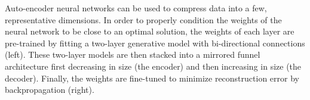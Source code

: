 Auto-encoder neural networks can be used to compress data into a few, representative dimensions. In order to properly condition the weights of the neural network to be close to an optimal solution, the weights of each layer are pre-trained by fitting a two-layer generative model with bi-directional connections (left). These two-layer models are then stacked into a mirrored funnel architecture first decreasing in size (the encoder) and then increasing in size (the decoder). Finally, the weights are fine-tuned to minimize reconstruction error by backpropagation (right). \label{fig:stacked_rbms}
